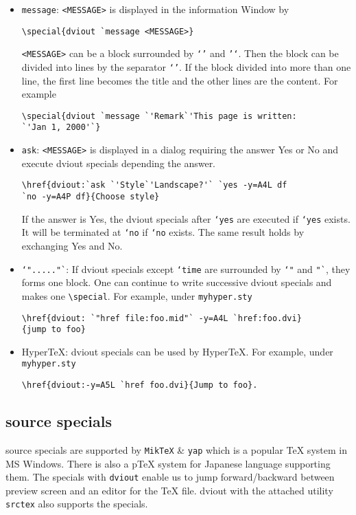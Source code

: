 \documentclass{article}
\begin{document}
\begin{itemize}
\item {\tt message}:
{\tt <MESSAGE>} is displayed in the information Window by
\begin{verbatim}
\special{dviout `message <MESSAGE>}
\end{verbatim}
{\tt<MESSAGE>} can be a block surrounded by {\tt `'} and {\tt '`}.
Then the block can be divided into lines by the separator {\tt `'}. 
If the block divided into more than one line, the first line becomes
the title and the other lines are the content.  For example
\begin{verbatim}
\special{dviout `message `'Remark`'This page is written:
`'Jan 1, 2000'`}
\end{verbatim}

\item {\tt ask}: {\tt <MESSAGE>} is displayed in a dialog requiring the 
answer Yes or No and execute dviout specials depending the answer.
\begin{verbatim}
\href{dviout:`ask `'Style`'Landscape?'` `yes -y=A4L df 
`no -y=A4P df}{Choose style}
\end{verbatim}
If the answer is Yes, the dviout specials after {\tt `yes} are executed if 
{\tt `yes} exists.  It will be terminated at {\tt `no} if {\tt `no} exists.
The same result holds by exchanging Yes and No.

\item {\tt `"....."`}:
If dviout specials except {\tt `time} are surrounded by {\tt `"} and {\tt "`}, 
they forms one block.  One can continue to write successive dviout specials and
makes one \verb|\special|.  For example, under {\tt myhyper.sty}
\begin{verbatim}
\href{dviout: `"href file:foo.mid"` -y=A4L `href:foo.dvi}
{jump to foo}
\end{verbatim}

\item Hyper\TeX:
dviout specials can be used by {Hyper\TeX}.
For example, under {\tt myhyper.sty}
\begin{verbatim}
\href{dviout:-y=A5L `href foo.dvi}{Jump to foo}.
\end{verbatim}
\end{itemize}

\subsection{source specials}
source specials are supported by {\tt MikTeX} \& {\tt yap} which is a popular 
{\TeX} system in MS Windows.  There is also a {p\TeX} system for Japanese 
language supporting them.
The specials with {\tt dviout} enable us to jump forward/backward between 
preview screen and an editor for the {\TeX} file.  
dviout with the attached utility {\tt srctex} also supports the specials.
\end{document}
